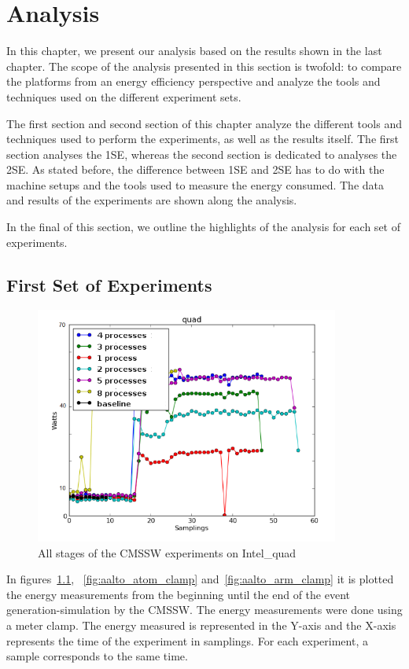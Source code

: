\chapter{Analysis}



In this chapter, we present our analysis based on the results shown in the last chapter. The scope of the analysis presented in this section is twofold: to compare the
platforms from an energy efficiency perspective and analyze the tools and techniques used on the different experiment sets. 


The first section and second section of this chapter analyze the different tools and techniques used
to perform the experiments, as well as the results itself. The first section analyses the 1SE, whereas the second section is dedicated to analyses the 2SE. As stated before, the difference between 1SE and 2SE has to do with the machine setups and the tools used to measure the energy consumed. The data and results of the experiments are shown along the analysis.

In the final of this section, we outline the highlights of the analysis for
each set of experiments.

\section{First Set of Experiments}

\begin{figure}[h]
  \centering
    \includegraphics[width=100mm]{"img/aalto/aalto_total_quad"}
    \caption{All stages of the CMSSW experiments on Intel\_quad}
    \label{fig:aalto_quad_clamp}
\end{figure}



In figures~\ref{fig:aalto_quad_clamp}, ~\ref{fig:aalto_atom_clamp} 
and~\ref{fig:aalto_arm_clamp} it is plotted the energy measurements from the beginning until the end of the event generation-simulation by the CMSSW. The energy measurements were done using a meter clamp. The energy measured is represented in the Y-axis and the X-axis represents the time of the experiment in samplings. For each experiment, a sample corresponds to the same time.

